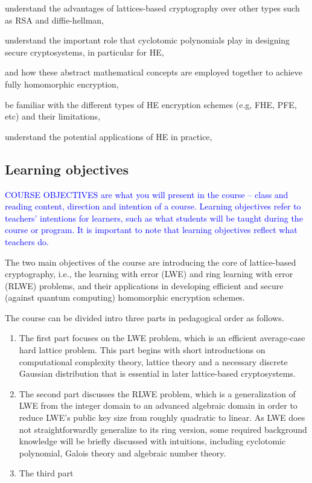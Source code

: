 \documentclass[../main.tex]{subfiles}
\begin{document}
understand the advantages of lattices-based cryptography over other types such as RSA and diffie-hellman, 

understand the important role that cyclotomic polynomials play in designing secure cryptosystems, in particular for HE, 

and how these abstract mathematical concepts are employed together to achieve fully homomorphic encryption,

be familiar with the different types of HE encryption schemes (e.g, FHE, PFE, etc) and their limitations, 

understand the potential applications of HE in practice,
\fi 


\subsection{Learning objectives}
\textcolor{blue}{COURSE	OBJECTIVES are	what	you	will	present	in	the	course	– class	and	reading	content,	direction	and	
intention	of	a	course.
Learning objectives refer to teachers’ intentions for learners, such as what students
will be taught during the course or program.
It is important to note that learning objectives reflect what teachers do.}

The two main objectives of the course are introducing the core of lattice-based cryptography, i.e., the learning with error (LWE) and ring learning with error (RLWE) problems, and their applications in developing efficient and secure (against quantum computing) homomorphic encryption schemes. 

The course can be divided intro three parts in pedagogical order as follows. 
\begin{enumerate}
    \item The first part focuses on the LWE problem, which is an efficient average-case hard lattice problem. This part begins with short introductions on computational complexity theory, lattice theory and a necessary discrete Gaussian distribution that is essential in later lattice-based cryptosystems.
    
    \item The second part discusses the RLWE problem, which is a generalization of LWE from the integer domain to an advanced algebraic domain in order to reduce LWE's public key size from roughly quadratic to linear. As LWE does not straightforwardly generalize to its ring version, some required background knowledge will be briefly discussed with intuitions, including cyclotomic polynomial, Galois theory and algebraic number theory. 
    
    \item The third part 
\end{enumerate}
\end{document}
